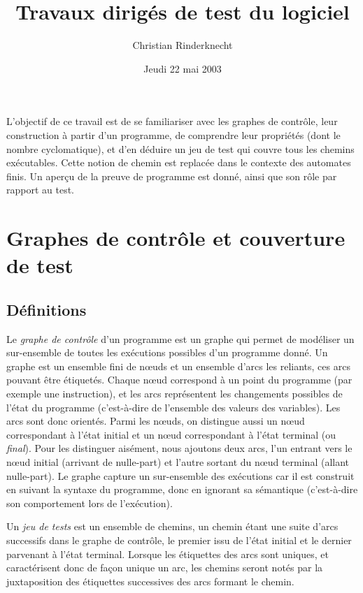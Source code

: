 \documentclass[11pt,a4paper]{article}
\title{Travaux dirigés de test du logiciel}
\author{Christian Rinderknecht}
\date{Jeudi 22 mai 2003}
\begin{document}
\maketitle

L'objectif de ce travail est de se familiariser avec les graphes de
contrôle, leur construction à partir d'un programme, de comprendre
leur propriétés (dont le nombre cyclomatique), et d'en déduire un jeu
de test qui couvre tous les chemins exécutables. Cette notion de
chemin est replacée dans le contexte des automates finis. Un aperçu de
la preuve de programme est donné, ainsi que son rôle par rapport au
test.


\section{Graphes de contrôle et couverture de test}

\subsection{Définitions}

Le \emph{graphe de contrôle} d'un programme est un graphe qui permet
de modéliser un sur-ensemble de toutes les exécutions possibles d'un
programme donné. Un graphe est un ensemble fini de nœuds et un
ensemble d'arcs les reliants, ces arcs pouvant être étiquetés. Chaque
nœud correspond à un point du programme (par exemple une
instruction), et les arcs représentent les changements possibles de
l'état du programme (c'est-à-dire de l'ensemble des valeurs des
variables). Les arcs sont donc orientés. Parmi les nœuds, on
distingue aussi un nœud correspondant à l'état initial et un
nœud correspondant à l'état terminal (ou \emph{final}). Pour les
distinguer aisément, nous ajoutons deux arcs, l'un entrant vers le
nœud initial (arrivant de nulle-part) et l'autre sortant du
nœud terminal (allant nulle-part). Le graphe capture un
sur-ensemble des exécutions car il est construit en suivant la syntaxe
du programme, donc en ignorant sa sémantique (c'est-à-dire son
comportement lors de l'exécution).

Un \emph{jeu de tests} est un ensemble de chemins, un chemin étant une
suite d'arcs successifs dans le graphe de contrôle, le premier issu de
l'état initial et le dernier parvenant à l'état terminal. Lorsque les
étiquettes des arcs sont uniques, et caractérisent donc de façon
unique un arc, les chemins seront notés par la juxtaposition des
étiquettes successives des arcs formant le chemin.
\end{document}
